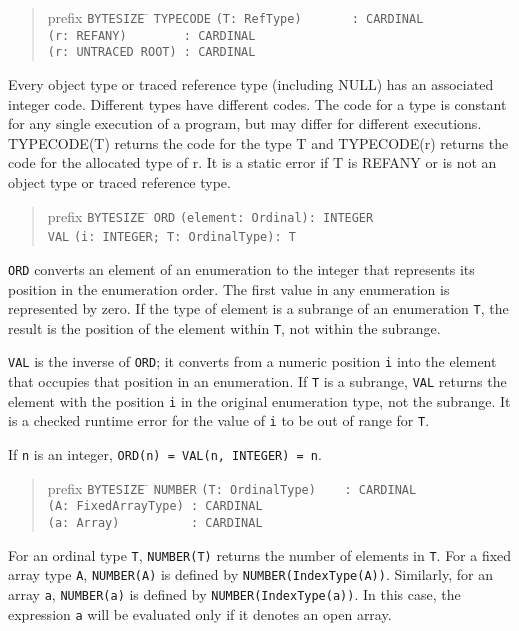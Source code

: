 \documentclass[10pt]{article}
\begin{document}
\begin{quote}
  \begin{tabbing}
    prefix \= \verb|BYTESIZE| \= \kill
           \> \verb|TYPECODE| \> \verb|(T: RefType)       : CARDINAL| \\
           \>                 \> \verb|(r: REFANY)        : CARDINAL| \\
           \>                 \> \verb|(r: UNTRACED ROOT) : CARDINAL|
  \end{tabbing}
\end{quote}
Every object type or traced reference type (including NULL) has an associated
integer code.  Different types have different codes.  The code for a type is
constant for any single execution of a program, but may differ for different
executions.  TYPECODE(T) returns the code for the type T and TYPECODE(r)
returns the code for the allocated type of r.  It is a static error if T is
REFANY or is not an object type or traced reference type.

\begin{quote}
  \begin{tabbing}
    prefix \= \verb|BYTESIZE| \= \kill
           \> \verb|ORD| \> \verb|(element: Ordinal): INTEGER| \\
           \> \verb|VAL| \> \verb|(i: INTEGER; T: OrdinalType): T|
  \end{tabbing}
\end{quote}
\verb|ORD| converts an element of an enumeration to the integer that
represents its position in the enumeration order.  The first value in any
enumeration is represented by zero.  If the type of element is a subrange of
an enumeration \verb|T|, the result is the position of the element within
\verb|T|, not within the subrange.

\verb|VAL| is the inverse of \verb|ORD|; it converts from a numeric position
\verb|i| into the element that occupies that position in an enumeration.  If
\verb|T| is a subrange, \verb|VAL| returns the element with the position
\verb|i| in the original enumeration type, not the subrange.  It is a checked
runtime error for the value of \verb|i| to be out of range for \verb|T|.

If \verb|n| is an integer, \verb|ORD(n) = VAL(n, INTEGER) = n|.

\begin{quote}
  \begin{tabbing}
    prefix \= \verb|BYTESIZE| \= \kill
           \> \verb|NUMBER| \> \verb|(T: OrdinalType)    : CARDINAL| \\
           \>               \> \verb|(A: FixedArrayType) : CARDINAL| \\
           \>               \> \verb|(a: Array)          : CARDINAL|
  \end{tabbing}
\end{quote}
For an ordinal type \verb|T|, \verb|NUMBER(T)| returns the number of elements
in \verb|T|.  For a fixed array type \verb|A|, \verb|NUMBER(A)| is defined by
\verb|NUMBER(IndexType(A))|.  Similarly, for an array \verb|a|,
\verb|NUMBER(a)| is defined by \verb|NUMBER(IndexType(a))|.  In this case, the
expression \verb|a| will be evaluated only if it denotes an open array.
\end{document}

